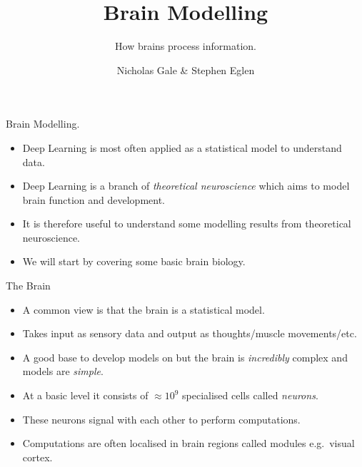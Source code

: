 \documentclass[
  ignorenonframetext,
]{beamer}
\title{Brain Modelling}
\subtitle{How brains process information.}
\author{Nicholas Gale \& Stephen Eglen}
\date{}
\begin{document}
\frame{\titlepage}
\ifdefined\Shaded\renewenvironment{Shaded}{\begin{tcolorbox}[enhanced, boxrule=0pt, interior hidden, frame hidden, borderline west={3pt}{0pt}{shadecolor}, sharp corners, breakable]}{\end{tcolorbox}}\fi

\begin{frame}{Brain Modelling.}
\protect\hypertarget{brain-modelling.}{}
\begin{itemize}
\item
  Deep Learning is most often applied as a statistical model to
  understand data.
\item
  Deep Learning is a branch of \emph{theoretical neuroscience} which
  aims to model brain function and development.
\item
  It is therefore useful to understand some modelling results from
  theoretical neuroscience.
\item
  We will start by covering some basic brain biology.
\end{itemize}
\end{frame}

\begin{frame}{The Brain}
\protect\hypertarget{the-brain}{}
\begin{itemize}
\item
  A common view is that the brain is a statistical model.
\item
  Takes input as sensory data and output as thoughts/muscle
  movements/etc.
\item
  A good base to develop models on but the brain is \emph{incredibly}
  complex and models are \emph{simple}.
\item
  At a basic level it consists of \(\approx 10^9\) specialised cells
  called \emph{neurons}.
\item
  These neurons signal with each other to perform computations.
\item
  Computations are often localised in brain regions called modules
  e.g.~visual cortex.
\end{itemize}
\end{frame}
\end{document}
